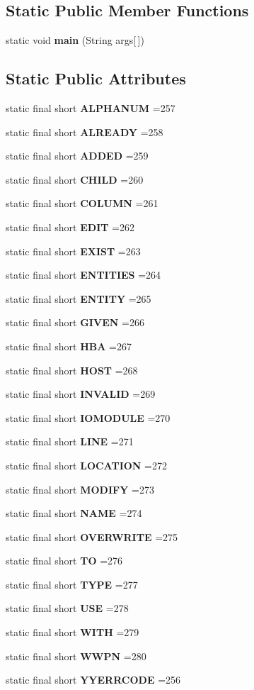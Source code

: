 \subsection*{Static Public Member Functions}
\begin{DoxyCompactItemize}
\item 
static void {\bf main} (String args[$\,$])
\end{DoxyCompactItemize}
\subsection*{Static Public Attributes}
\begin{DoxyCompactItemize}
\item 
static final short {\bf A\+L\+P\+H\+A\+N\+U\+M} =257
\item 
static final short {\bf A\+L\+R\+E\+A\+D\+Y} =258
\item 
static final short {\bf A\+D\+D\+E\+D} =259
\item 
static final short {\bf C\+H\+I\+L\+D} =260
\item 
static final short {\bf C\+O\+L\+U\+M\+N} =261
\item 
static final short {\bf E\+D\+I\+T} =262
\item 
static final short {\bf E\+X\+I\+S\+T} =263
\item 
static final short {\bf E\+N\+T\+I\+T\+I\+E\+S} =264
\item 
static final short {\bf E\+N\+T\+I\+T\+Y} =265
\item 
static final short {\bf G\+I\+V\+E\+N} =266
\item 
static final short {\bf H\+B\+A} =267
\item 
static final short {\bf H\+O\+S\+T} =268
\item 
static final short {\bf I\+N\+V\+A\+L\+I\+D} =269
\item 
static final short {\bf I\+O\+M\+O\+D\+U\+L\+E} =270
\item 
static final short {\bf L\+I\+N\+E} =271
\item 
static final short {\bf L\+O\+C\+A\+T\+I\+O\+N} =272
\item 
static final short {\bf M\+O\+D\+I\+F\+Y} =273
\item 
static final short {\bf N\+A\+M\+E} =274
\item 
static final short {\bf O\+V\+E\+R\+W\+R\+I\+T\+E} =275
\item 
static final short {\bf T\+O} =276
\item 
static final short {\bf T\+Y\+P\+E} =277
\item 
static final short {\bf U\+S\+E} =278
\item 
static final short {\bf W\+I\+T\+H} =279
\item 
static final short {\bf W\+W\+P\+N} =280
\item 
static final short {\bf Y\+Y\+E\+R\+R\+C\+O\+D\+E} =256
\end{DoxyCompactItemize}


